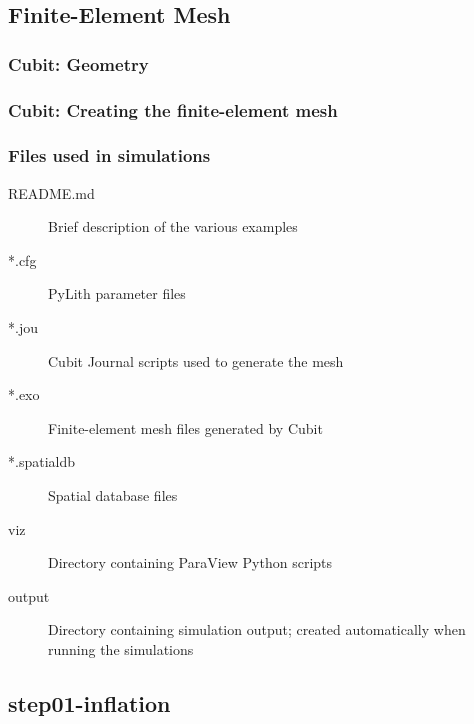 \documentclass[aspectratio=169]{beamer}
\begin{document}
\subsection{Finite-Element Mesh}

\begin{frame}
  \frametitle{Cubit: Geometry}
  \summary{}

  
\end{frame}


\begin{frame}
  \frametitle{Cubit: Creating the finite-element mesh}

  
\end{frame}


\begin{frame}
  \frametitle{Files used in simulations}

  \begin{description}
  \item[README.md] Brief description of the various examples
  \item[*.cfg] PyLith parameter files
  \item[*.jou] Cubit Journal scripts used to generate the mesh
  \item[*.exo] Finite-element mesh files generated by Cubit
  \item[*.spatialdb] Spatial database files
  \item[viz] Directory containing ParaView Python scripts
  \item[output] Directory containing simulation output; created automatically when running the simulations
  \end{description}

\end{frame}
  

\subsection{step01-inflation}
\end{document}
